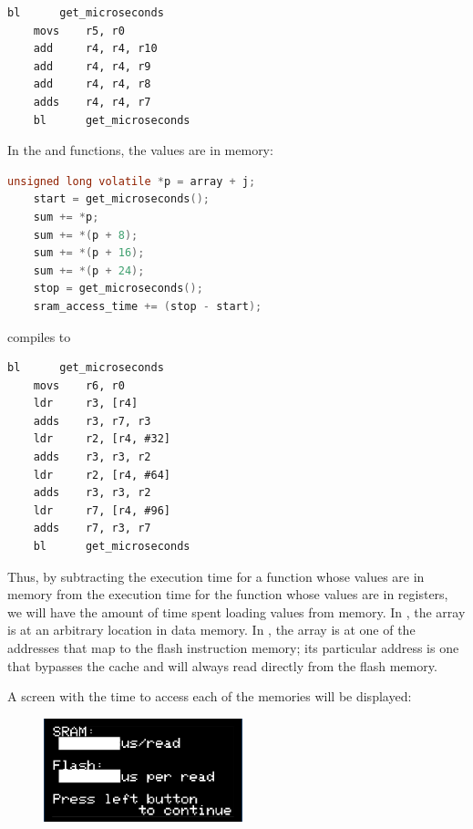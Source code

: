 \begin{lstlisting}[language={[ARM]Assembler}]
    bl      get_microseconds
    movs    r5, r0
    add     r4, r4, r10
    add     r4, r4, r9
    add     r4, r4, r8
    adds    r4, r4, r7
    bl      get_microseconds
\end{lstlisting}

In the  and  functions, the values are in memory:

\begin{lstlisting}[language=c]
    unsigned long volatile *p = array + j;
    start = get_microseconds();
    sum += *p;
    sum += *(p + 8);
    sum += *(p + 16);
    sum += *(p + 24);
    stop = get_microseconds();
    sram_access_time += (stop - start);
\end{lstlisting}

compiles to

\begin{lstlisting}[language={[ARM]Assembler}]
    bl      get_microseconds
    movs    r6, r0
    ldr     r3, [r4]
    adds    r3, r7, r3
    ldr     r2, [r4, #32]
    adds    r3, r3, r2
    ldr     r2, [r4, #64]
    adds    r3, r3, r2
    ldr     r7, [r4, #96]
    adds    r7, r3, r7
    bl      get_microseconds
\end{lstlisting}

Thus, by subtracting the execution time for a function whose values are in memory from the execution time for the function whose values are in registers,
we will have the amount of time spent loading values from memory.
In , the array is at an arbitrary location in data memory.
In , the array is at one of the addresses that map to the flash instruction memory; its particular address is one that bypasses the cache and will always read directly from the flash memory.

\begin{description}
\end{description}

A screen with the time to access each of the memories will be displayed:

\begin{figure}[h]
    \includegraphics[height=3cm]{Mk4Screens/Option1}
\end{figure}

